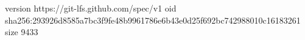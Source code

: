 version https://git-lfs.github.com/spec/v1
oid sha256:293926d8585a7bc3f9fe48b9961786e6b43e0d25f692bc742988010c16183261
size 9433
